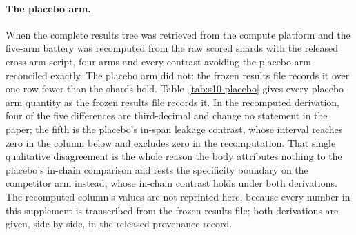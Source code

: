 \documentclass[letterpaper]{article}
\begin{document}
\paragraph{The placebo arm.}
When the complete results tree was retrieved from the compute platform and the
five-arm battery was recomputed from the raw scored shards with the released
cross-arm script, four arms and every contrast avoiding the placebo arm
reconciled exactly.  The placebo arm did not: the frozen results file records it
over one row fewer than the shards hold.  Table~\ref{tab:s10-placebo} gives every
placebo-arm quantity as the frozen results file records it.  In the recomputed
derivation, four of the five differences are third-decimal and change no
statement in the paper; the fifth is the placebo's in-span leakage contrast,
whose interval reaches zero in the column below and excludes zero in the
recomputation.  That single qualitative disagreement is the whole reason the body
attributes nothing to the placebo's in-chain comparison and rests the
specificity boundary on the competitor arm instead, whose in-chain contrast holds
under both derivations.  The recomputed column's values are not reprinted here,
because every number in this supplement is transcribed from the frozen results
file; both derivations are given, side by side, in the released provenance
record.
\end{document}
